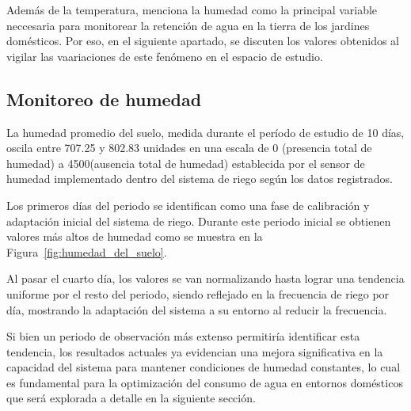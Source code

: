 \documentclass[pdflatex,sn-mathphys-num]{sn-jnl}%
\theoremstyle{thmstyleone}%
\theoremstyle{thmstyletwo}%
\theoremstyle{thmstylethree}%
\begin{document}
\begin{multicols}{2}
\justifying

Además de la temperatura, \cite{ref12} menciona la humedad como la principal variable neccesaria para monitorear la retención de agua en la tierra de los jardines domésticos. Por eso, en el siguiente apartado, se discuten los valores obtenidos al vigilar las vaariaciones de este fenómeno en el espacio de estudio.
\subsection*{Monitoreo de humedad}

La humedad promedio del suelo, medida durante el período de estudio de 10 días, oscila entre 707.25 y 802.83 unidades en una escala de 0 (presencia total de humedad) a 4500(ausencia total de humedad) establecida por el sensor de humedad implementado dentro del sistema de riego según los datos registrados.

Los primeros días del periodo se identifican como una fase de calibración y adaptación inicial del sistema de riego. Durante este periodo inicial se obtienen valores más altos de humedad como se muestra en la Figura~\ref{fig:humedad_del_suelo}.

Al pasar el cuarto día, los valores se van normalizando hasta lograr una tendencia uniforme por el resto del periodo, siendo reflejado en la frecuencia de riego por día, mostrando la adaptación del sistema a su entorno al reducir la frecuencia.  

Si bien un periodo de observación más extenso permitiría identificar esta tendencia, los resultados actuales ya evidencian una mejora significativa en la capacidad del sistema para mantener condiciones de humedad constantes, lo cual es fundamental para la optimización del consumo de agua en entornos domésticos que será explorada a detalle en la siguiente sección.
\end{multicols}
\newpage
\end{document}
